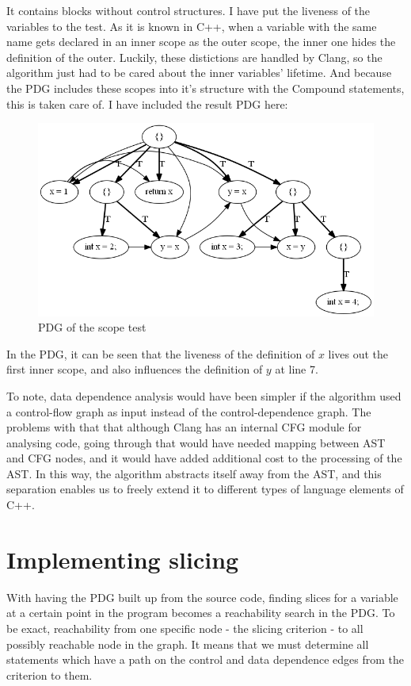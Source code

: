 \documentclass[oneside,12pt,a4paper]{book}
\begin{document}
It contains blocks without control structures. I have put the liveness of the variables to the test. As it is known in C++, when a variable with the same name gets declared in an inner scope as the outer scope, the inner one hides the definition of the outer. Luckily, these distictions are handled by Clang, so the algorithm just had to be cared about the inner variables' lifetime. And because the PDG includes these scopes into it's structure with the Compound statements, this is taken care of.
I have included the result PDG here:
\begin{figure}[h]
\centering
\includegraphics[width=.8\textwidth]{compound_block_test}
\caption{PDG of the scope test}
\label{fig:scope_test}
\end{figure}

In the PDG, it can be seen that the liveness of the definition of $x$ lives out the first inner scope, and also influences the definition of $y$ at line 7.

To note, data dependence analysis would have been simpler if the algorithm used a control-flow graph as input instead of the control-dependence graph. The problems with that that although Clang has an internal CFG module for analysing code, going through that would have needed mapping between AST and CFG nodes, and it would have added additional cost to the processing of the AST. In this way, the algorithm abstracts itself away from the AST, and this separation enables us to freely extend it to different types of language elements of C++.

\section{Implementing slicing}

With having the PDG built up from the source code, finding slices for a variable at a certain point in the program becomes a reachability search in the PDG. To be exact, reachability from one specific node - the slicing criterion - to all possibly reachable node in the graph. It means that we must determine all statements which have a path on the control and data dependence edges from the criterion to them.
\end{document}
